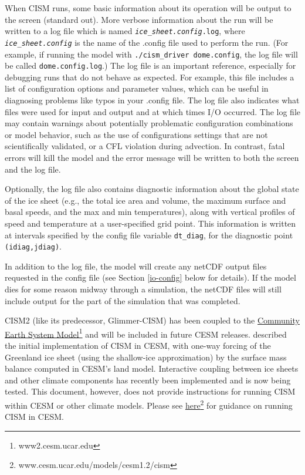 When CISM runs, some basic information about its operation will be output to 
the screen (standard out).  More verbose information about the run will be written 
to a log file which is named \texttt{\textit{ice\_sheet.config}.log}, where 
\texttt{\textit{ice\_sheet.config}} is the name of the .config file used to perform
the run.  (For example, if running the model with \texttt{./cism\_driver dome.config},
the log file will be called  \texttt{dome.config.log}.)  The log file is an
important reference, especially for debugging runs that do not behave as expected.
For example, this file includes a list of configuration options and parameter
values, which can be useful in diagnosing problems like typos in your .config file.
The log file also indicates what files were used for input and output and at which
times I/O occurred.  The log file may contain warnings about potentially 
problematic configuration combinations or model behavior, such as the use of
configurations settings that are not scientifically validated, or a CFL violation
during advection.  In contrast, fatal errors will kill the model and the error
message will be written to both the screen and the log file.

Optionally, the log file also contains diagnostic information about the global
state of the ice sheet (e.g., the total ice area and volume, the maximum surface and basal
speeds, and the max and min temperatures), along with vertical profiles of speed
and temperature at a user-specified grid point.  This information is written at intervals
specified by the config file variable \texttt{dt\_diag}, for the diagnostic
point \texttt{(idiag,jdiag)}.

In addition to the log file, the model will create any netCDF output files requested
in the config file (see Section \ref{io-config} below for details).  
If the model dies for some reason midway through a simulation,
the netCDF files will still include output for the part of the simulation that 
was completed.

CISM2 (like its predecessor, Glimmer-CISM) has been coupled to the 
\href{https://www2.cesm.ucar.edu/}{Community Earth System Model}\footnote{www2.cesm.ucar.edu}
and will be included in future CESM releases. 
\citet{Lipscomb_2013} described the initial implementation of CISM in CESM, with one-way forcing
of the Greenland ice sheet (using the shallow-ice approximation) by the surface mass balance
computed in CESM's land model.  Interactive coupling between ice sheets and other climate components
has recently been implemented and is now being tested. This document, however, does not provide 
instructions for running CISM within CESM or other climate models. 
Please see \href{http://www.cesm.ucar.edu/models/cesm1.2/cism/}{here}\footnote{www.cesm.ucar.edu/models/cesm1.2/cism}
for guidance on running CISM in CESM.

